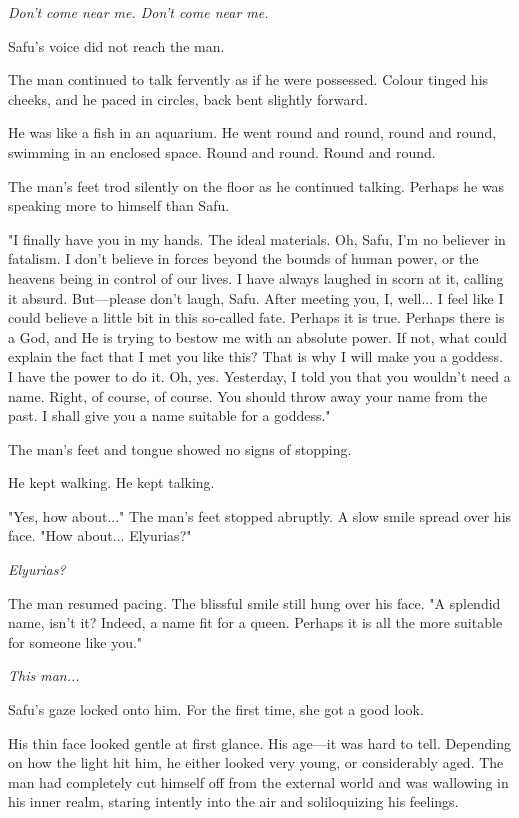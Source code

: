 \emph{Don't come near me. Don't come near me.}

Safu's voice did not reach the man.

The man continued to talk fervently as if he were possessed. Colour
tinged his cheeks, and he paced in circles, back bent slightly forward.

He was like a fish in an aquarium. He went round and round, round and
round, swimming in an enclosed space. Round and round. Round and round.

The man's feet trod silently on the floor as he continued talking.
Perhaps he was speaking more to himself than Safu.

"I finally have you in my hands. The ideal materials. Oh, Safu, I'm no
believer in fatalism. I don't believe in forces beyond the bounds of
human power, or the heavens being in control of our lives. I have always
laughed in scorn at it, calling it absurd. But---please don't laugh, Safu.
After meeting you, I, well... I feel like I could believe a little bit
in this so-called fate. Perhaps it is true. Perhaps there is a God, and
He is trying to bestow me with an absolute power. If not, what could
explain the fact that I met you like this? That is why I will make you a
goddess. I have the power to do it. Oh, yes. Yesterday, I told you that
you wouldn't need a name. Right, of course, of course. You should throw
away your name from the past. I shall give you a name suitable for a
goddess."

The man's feet and tongue showed no signs of stopping.

He kept walking. He kept talking.

"Yes, how about..." The man's feet stopped abruptly. A slow smile spread
over his face. "How about... Elyurias?"

\emph{Elyurias?}

The man resumed pacing. The blissful smile still hung over his face. "A
splendid name, isn't it? Indeed, a name fit for a queen. Perhaps it is
all the more suitable for someone like you."

\emph{This man...}

Safu's gaze locked onto him. For the first time, she got a good look.

His thin face looked gentle at first glance. His age---it was hard to
tell. Depending on how the light hit him, he either looked very young,
or considerably aged. The man had completely cut himself off from the
external world and was wallowing in his inner realm, staring intently
into the air and soliloquizing his feelings.

